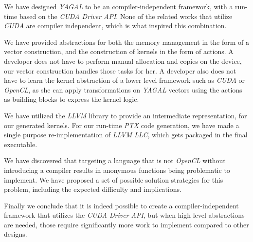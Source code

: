 We have designed \textit{YAGAL} to be an compiler-independent framework, with a run-time based on the \textit{CUDA Driver API}. None of the related works that utilize \textit{CUDA} are compiler independent, which is what inspired this combination.

We have provided abstractions for both the memory management in the form of a vector construction, and the construction of kernels in the form of actions. A developer does not have to perform manual allocation and copies on the device, our vector construction handles those tasks for her. A developer also does not have to learn the kernel abstraction of a lower level framework such as \textit{CUDA} or \textit{OpenCL}, as she can apply transformations on \textit{YAGAL} vectors using the actions as building blocks to express the kernel logic.

We have utilized the \textit{LLVM} library to provide an intermediate representation, for our generated kernels. For our run-time \textit{PTX} code generation, we have made a single purpose re-implementation of \textit{LLVM LLC}, which gets packaged in the final executable.

We have discovered that targeting a language that is not \textit{OpenCL} without introducing a compiler results in anonymous functions being problematic to implement. We have proposed a set of possible solution strategies for this problem, including the expected difficulty and implications.

Finally we conclude that it is indeed possible to create a compiler-independent framework that utilizes the \textit{CUDA Driver API}, but when high level abstractions are needed, those require significantly more work to implement compared to other designs.
